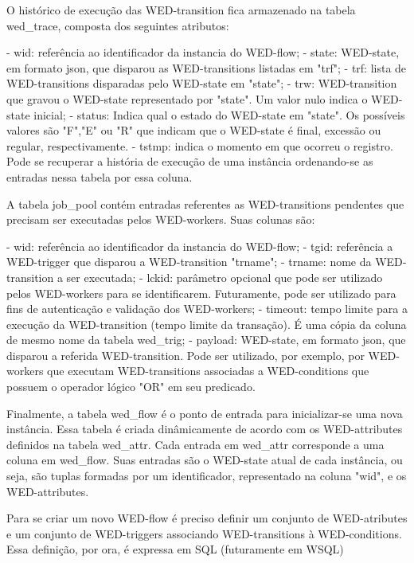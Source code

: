   O histórico de execução das WED-transition fica armazenado na tabela wed_trace, composta dos seguintes atributos:
  
  - wid: referência ao identificador da instancia do WED-flow;
  - state: WED-state, em formato json, que disparou as WED-transitions listadas em "trf";
  - trf: lista de WED-transitions disparadas pelo WED-state em "state";
  - trw: WED-transition que gravou o WED-state representado por "state". Um valor nulo indica o WED-state inicial;
  - status: Indica qual o estado do WED-state em "state". Os possíveis valores são "F","E" ou "R" que indicam que o WED-state
           é final, excessão ou regular, respectivamente.
  - tstmp: indica o momento em que ocorreu o registro. Pode se recuperar a história de execução de uma instância ordenando-se
          as entradas nessa tabela por essa coluna.
  
  A tabela job_pool contém entradas referentes as WED-transitions pendentes que precisam ser executadas pelos WED-workers.
Suas colunas são:
  
  - wid: referência ao identificador da instancia do WED-flow;
  - tgid: referência a WED-trigger que disparou a WED-transition "trname";
  - trname: nome da WED-transition a ser executada;
  - lckid: parâmetro opcional que pode ser utilizado pelos WED-workers para se identificarem. Futuramente, pode ser utilizado
          para fins de autenticação e validação dos WED-workers;
  - timeout: tempo limite para a execução da WED-transition (tempo limite da transação). É uma cópia da coluna de mesmo
            nome da tabela wed_trig;
  - payload: WED-state, em formato json, que disparou a referida WED-transition. Pode ser utilizado, por exemplo, por
            WED-workers que executam WED-transitions associadas a WED-conditions que possuem o operador lógico "OR" em 
            seu predicado.
  
  Finalmente, a tabela wed_flow é o ponto de entrada para inicializar-se uma nova instância. Essa tabela é criada dinâmicamente
de acordo com os WED-attributes definidos na tabela wed_attr. Cada entrada em wed_attr corresponde a uma coluna em wed_flow.
Suas entradas são o WED-state atual de cada instância, ou seja, são tuplas formadas por um identificador, representado
na coluna "wid", e os WED-attributes. 
  

 
  Para se criar um novo WED-flow é preciso definir um conjunto de WED-atributes e um conjunto de WED-triggers associando
WED-transitions à WED-conditions. Essa definição, por ora, é expressa em SQL (futuramente em WSQL)
  
  


 





  

 
    
